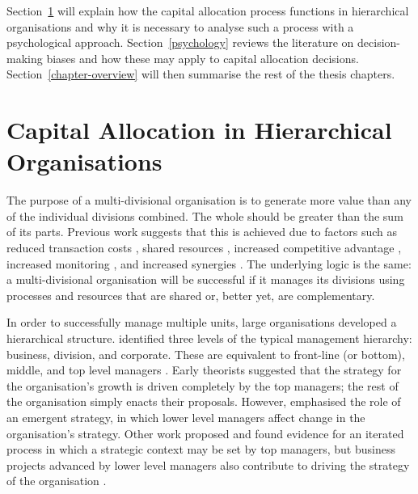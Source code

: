 \documentclass[a4paper, nobind]{templates/ociamthesis}
\theoremstyle{definition}
\theoremstyle{definition}
\theoremstyle{definition}
\theoremstyle{definition}
\theoremstyle{remark}
\begin{document}
Section~\ref{capital-allocation} will explain how the capital allocation
process functions in hierarchical organisations and why it is necessary to
analyse such a process with a psychological approach. Section~\ref{psychology}
reviews the literature on decision-making biases and how these may apply to
capital allocation decisions. Section~\ref{chapter-overview} will then
summarise the rest of the thesis chapters.

\hypertarget{capital-allocation}{%
\section{Capital Allocation in Hierarchical Organisations}\label{capital-allocation}}

The purpose of a multi-divisional organisation is to generate more value than
any of the individual divisions combined. The whole should be greater than the
sum of its parts. Previous work suggests that this is achieved due to factors
such as reduced transaction costs \autocite{williamson1981,teece1982,teece1980,coase1937,liebeskind2000}, shared resources \autocite{wernerfelt1984,barney1991},
increased competitive advantage \autocite{porter1980,porter1985}, increased monitoring
\autocite{gertner1994}, and increased synergies \autocite{barney1988}. The underlying logic is
the same: a multi-divisional organisation will be successful if it manages its
divisions using processes and resources that are shared or, better yet, are
complementary.

In order to successfully manage multiple units, large organisations developed a
hierarchical structure. \textcite{bower1970} identified three levels of the typical
management hierarchy: business, division, and corporate. These are equivalent to
front-line (or bottom), middle, and top level managers \autocite{noda1996}. Early
theorists suggested that the strategy for the organisation's growth is driven
completely by the top managers; the rest of the organisation simply enacts their
proposals. However, \textcite{mintzberg1985} emphasised the role of an emergent strategy,
in which lower level managers affect change in the organisation's strategy.
Other work proposed and found evidence for an iterated process in which a
strategic context may be set by top managers, but business projects advanced by
lower level managers also contribute to driving the strategy of the organisation
\autocite{noda1996,burgelman1983,bower1970}.
\end{document}
